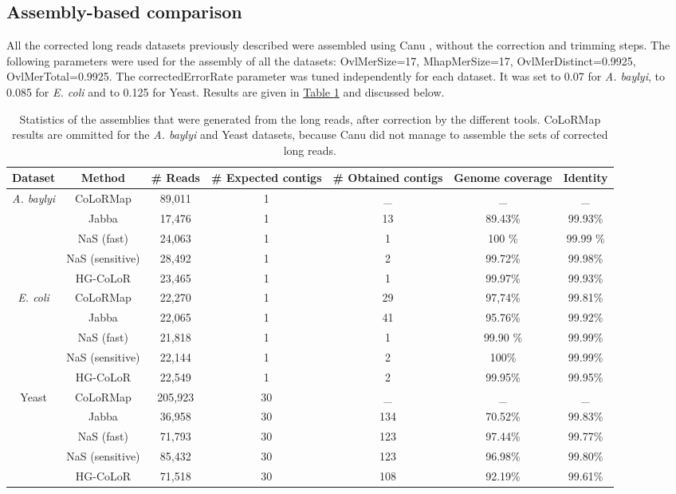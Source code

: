 \documentclass[long, final]{jobim2017}
\begin{document}
\subsection{Assembly-based comparison}
	
All the corrected long reads datasets previously described were assembled using Canu \cite{Koren2016}, without the correction and trimming steps. The following parameters were used for the assembly of all the datasets: OvlMerSize=17, MhapMerSize=17, OvlMerDistinct=0.9925, OvlMerTotal=0.9925. The correctedErrorRate parameter was tuned independently for each dataset. It was set to 0.07 for \emph{A. baylyi}, to 0.085 for \emph{E. coli} and to 0.125 for Yeast. Results are given in \hyperref[tabas]{Table \ref*{tabas}} and discussed below.

\begin{table}[ht]
	\begin{center}
	\begin{tabular}{|c|c|c|c|c|c|c|}
		\hline
		\textbf{Dataset} & \textbf{Method} & \textbf{\# Reads} & \textbf{\# Expected contigs} & \textbf{\# Obtained contigs} & \textbf{Genome coverage} 
		& \textbf{Identity} \\
		\hline
		\multirow{5}{*}{\emph{A. baylyi}} & CoLoRMap & 89,011 & 1 & \_ & \_ & \_ \\
		& Jabba & 17,476 & 1 & 13 & 89.43\% & 99.93\% \\
		& NaS (fast) & 24,063 & 1 & 1 & 100 \% & 99.99 \% \\
		& NaS (sensitive) & 28,492 & 1 & 2 & 99.72\% & 99.98\% \\
		& HG-CoLoR & 23,465 & 1 & 1 & 99.97\% & 99.93\% \\
		\hline
		\multirow{5}{*}{\emph{E. coli}} & CoLoRMap & 22,270 & 1 & 29 & 97,74\% & 99.81\% \\
		& Jabba & 22,065 & 1 & 41 & 95.76\% & 99.92\% \\
		& NaS (fast) & 21,818 & 1 & 1 & 99.90 \% & 99.99\% \\
		& NaS (sensitive) & 22,144 & 1 & 2 & 100\% & 99.99\% \\
		& HG-CoLoR & 22,549 & 1 & 2 & 99.95\% & 99.95\% \\
		\hline
		\multirow{5}{*}{Yeast} & CoLoRMap & 205,923 & 30 & \_ & \_ & \_ \\
		& Jabba & 36,958 & 30 & 134 & 70.52\% & 99.83\% \\
		& NaS (fast) & 71,793 & 30 & 123 & 97.44\% & 99.77\% \\
		& NaS (sensitive) & 85,432 & 30 & 123 & 96.98\% & 99.80\% \\
		& HG-CoLoR & 71,518 & 30 & 108 & 92.19\% & 99.61\% \\
		\hline
	\end{tabular}
	\end{center}
	\caption{Statistics of the assemblies that were generated from the long reads, after correction by the different tools. CoLoRMap results are ommitted 
	for the \emph{A. baylyi} and Yeast datasets, because Canu did not manage to assemble the sets of corrected long reads.
	\label{tabas}}
\end{table}
\end{document}
